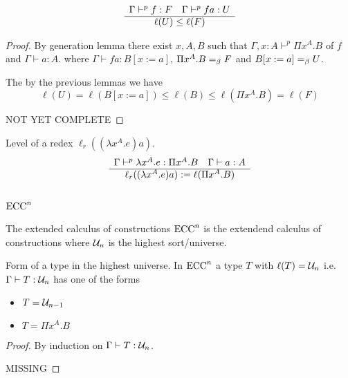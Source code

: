 \begin{lemma}
  $$
  \begin{array}{c} \Gamma \vdash^p f : F
    \quad
    \Gamma \vdash^p f a : U
   \\ \hline \ell(U) \le \ell(F)\end{array}
  $$
  \begin{proof}
    By generation lemma there exist $x,A,B$ such that
    $\Gamma,x:A \vdash^p \Pi x^A.B$ of $f$
    and
    $\Gamma \vdash a:A$.  where $\Gamma \vdash f a : B[x:=a]$,
    $\Pi x^A.B =_\beta F$ and $B[x:=a] =_\beta U$.

    The by the previous lemmas we have
    $$
    \ell(U) = \ell(B[x:=a]) \le \ell(B) \le \ell(\Pi x^A.B) = \ell(F)
    $$

    NOT YET COMPLETE
  \end{proof}
\end{lemma}


\begin{definition}
  Level of a redex $\ell_r((\lambda x^A.e) a)$.
  $$
  \begin{array}{c} \Gamma \vdash^p \lambda x^A.e : \Pi x^A.B
    \quad
    \Gamma \vdash a: A
     \\ \hline \ell_r((\lambda x^A.e) a) := \ell(\Pi x^A.B)\end{array}
  $$
\end{definition}



\subsection{$\text{ECC}^n$}

\begin{definition}
The extended calculus of constructions $\text{ECC}^n$ is the extendend calculus of
constructions where ${\cal U}_n$ is the highest sort/universe.
\end{definition}

\begin{lemma}
  Form of a type in the highest universe.
  In $\text{ECC}^n$ a type $T$ with $\ell(T) = {\cal U}_n$ i.e. $\Gamma \vdash T :
  {\cal U}_n$ has one of the forms
  \begin{itemize}
  \item $T = {\cal U}_{n-1}$
    
  \item $T = \Pi x^A.B$
  \end{itemize}
  \begin{proof}
    By induction on $\Gamma \vdash T: {\cal U}_n$.

    MISSING
  \end{proof}
\end{lemma}



